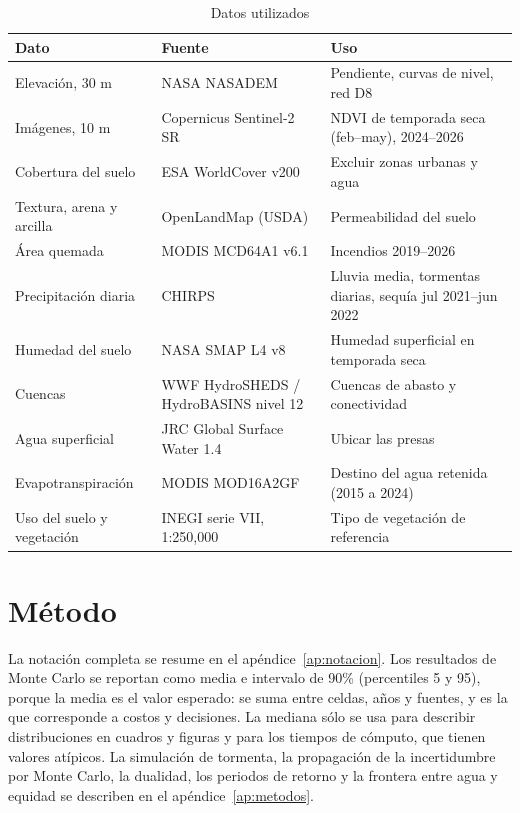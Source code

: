\begin{table}[H]\centering\small
\caption{Datos utilizados}\label{tab:datos}
\begin{tabularx}{\linewidth}{lXl}
\toprule
Dato & Fuente & Uso \\
\midrule
Elevación, 30 m & NASA NASADEM & Pendiente, curvas de nivel, red D8 \\
Imágenes, 10 m & Copernicus Sentinel-2 SR & NDVI de temporada seca (feb–may), 2024–2026 \\
Cobertura del suelo & ESA WorldCover v200 & Excluir zonas urbanas y agua \\
Textura, arena y arcilla & OpenLandMap (USDA) & Permeabilidad del suelo \\
Área quemada & MODIS MCD64A1 v6.1 & Incendios 2019–2026 \\
Precipitación diaria & CHIRPS & Lluvia media, tormentas diarias, sequía jul 2021–jun 2022 \\
Humedad del suelo & NASA SMAP L4 v8 & Humedad superficial en temporada seca \\
Cuencas & WWF HydroSHEDS / HydroBASINS nivel 12 & Cuencas de abasto y conectividad \\
Agua superficial & JRC Global Surface Water 1.4 & Ubicar las presas \\
Evapotranspiración & MODIS MOD16A2GF & Destino del agua retenida (2015 a 2024) \\
Uso del suelo y vegetación & INEGI serie VII, 1:250,000 & Tipo de vegetación de referencia \\
\bottomrule
\end{tabularx}
\end{table}

\section{Método}

La notación completa se resume en el apéndice~\ref{ap:notacion}. Los resultados de Monte Carlo se reportan como media e intervalo de 90\% (percentiles 5 y 95), porque la media es el valor esperado: se suma entre celdas, años y fuentes, y es la que corresponde a costos y decisiones. La mediana sólo se usa para describir distribuciones en cuadros y figuras y para los tiempos de cómputo, que tienen valores atípicos. La simulación de tormenta, la propagación de la incertidumbre por Monte Carlo, la dualidad, los periodos de retorno y la frontera entre agua y equidad se describen en el apéndice~\ref{ap:metodos}.

